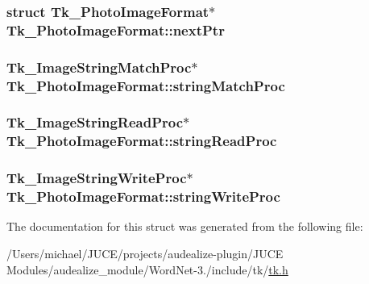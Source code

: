 \subsubsection[{\texorpdfstring{next\+Ptr}{nextPtr}}]{\setlength{\rightskip}{0pt plus 5cm}struct {\bf Tk\+\_\+\+Photo\+Image\+Format}$\ast$ Tk\+\_\+\+Photo\+Image\+Format\+::next\+Ptr}\hypertarget{struct_tk___photo_image_format_add05c1edda9fefcd7a424949107c7798}{}\label{struct_tk___photo_image_format_add05c1edda9fefcd7a424949107c7798}
\subsubsection[{\texorpdfstring{string\+Match\+Proc}{stringMatchProc}}]{\setlength{\rightskip}{0pt plus 5cm}Tk\+\_\+\+Image\+String\+Match\+Proc$\ast$ Tk\+\_\+\+Photo\+Image\+Format\+::string\+Match\+Proc}\hypertarget{struct_tk___photo_image_format_a8acd703ea8ae51743741cf1ed977fc13}{}\label{struct_tk___photo_image_format_a8acd703ea8ae51743741cf1ed977fc13}
\subsubsection[{\texorpdfstring{string\+Read\+Proc}{stringReadProc}}]{\setlength{\rightskip}{0pt plus 5cm}Tk\+\_\+\+Image\+String\+Read\+Proc$\ast$ Tk\+\_\+\+Photo\+Image\+Format\+::string\+Read\+Proc}\hypertarget{struct_tk___photo_image_format_a1f3cf1bee713671b67033aff6ecc4f70}{}\label{struct_tk___photo_image_format_a1f3cf1bee713671b67033aff6ecc4f70}
\subsubsection[{\texorpdfstring{string\+Write\+Proc}{stringWriteProc}}]{\setlength{\rightskip}{0pt plus 5cm}Tk\+\_\+\+Image\+String\+Write\+Proc$\ast$ Tk\+\_\+\+Photo\+Image\+Format\+::string\+Write\+Proc}\hypertarget{struct_tk___photo_image_format_a577d032e743abaa18337ddb0bc7fb499}{}\label{struct_tk___photo_image_format_a577d032e743abaa18337ddb0bc7fb499}


The documentation for this struct was generated from the following file\+:\begin{DoxyCompactItemize}
\item 
/\+Users/michael/\+J\+U\+C\+E/projects/audealize-\/plugin/\+J\+U\+C\+E Modules/audealize\+\_\+module/\+Word\+Net-\/3./include/tk/\hyperlink{tk_8h}{tk.\+h}\end{DoxyCompactItemize}
